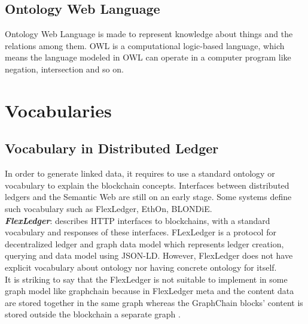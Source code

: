 \subsection{Ontology Web Language }
Ontology Web Language is made to represent knowledge about things and the relations among them. OWL is a computational logic-based language, which means the language modeled in OWL can operate in a computer program like negation, intersection and so on.
 
\section{Vocabularies}
\subsection{Vocabulary in Distributed Ledger}
In order to generate linked data, it requires to use a standard ontology or vocabulary to explain the blockchain concepts. Interfaces between distributed ledgers and the Semantic Web are still on an early stage. Some systems define such vocabulary such as FlexLedger, EthOn, BLONDiE\cite{Third}.\\

\textbf{\textit{FlexLedger}}: describes HTTP interfaces to blockchains, with a standard vocabulary and responses of these interfaces. FLexLedger is a protocol for decentralized ledger and graph data model which represents ledger creation, querying and data model using JSON-LD. However, FlexLedger does not have explicit vocabulary about ontology nor having concrete ontology for itself. 
\\It is striking to say that the FlexLedger is not suitable to implement in some graph model like graphchain because in FlexLedger meta and the content data are stored together in the same graph whereas the GraphChain blocks’ content is stored outside the blockchain a separate graph \cite{Sopek}.\\

